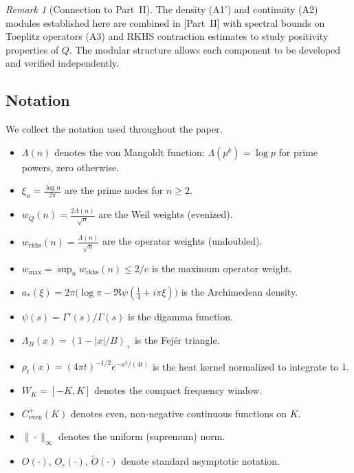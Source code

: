 \documentclass[11pt,a4paper]{article}
\theoremstyle{definition}
\theoremstyle{remark}
\newtheorem{remark}[theorem]{Remark}
\begin{document}
\begin{remark}[Connection to Part~II]\label{rem:part2}
The density (A1') and continuity (A2) modules established here are combined in [Part~II] with spectral bounds on Toeplitz operators (A3) and RKHS contraction estimates to study positivity properties of $Q$. The modular structure allows each component to be developed and verified independently.
\end{remark}

\subsection{Notation}\label{sec:notation}

We collect the notation used throughout the paper.

\begin{itemize}
\item $\Lambda(n)$ denotes the von Mangoldt function: $\Lambda(p^k) = \log p$ for prime powers, zero otherwise.

\item $\xi_n = \frac{\log n}{2\pi}$ are the prime nodes for $n \geq 2$.

\item $w_Q(n) = \frac{2\Lambda(n)}{\sqrt{n}}$ are the Weil weights (evenized).

\item $w_{\mathrm{rkhs}}(n) = \frac{\Lambda(n)}{\sqrt{n}}$ are the operator weights (undoubled).

\item $w_{\max} = \sup_n w_{\mathrm{rkhs}}(n) \leq 2/e$ is the maximum operator weight.

\item $a_*(\xi) = 2\pi\bigl(\log\pi - \Re\psi(\tfrac{1}{4} + i\pi\xi)\bigr)$ is the Archimedean density.

\item $\psi(s) = \Gamma'(s)/\Gamma(s)$ is the digamma function.

\item $\Lambda_B(x) = (1 - |x|/B)_+$ is the Fej\'er triangle.

\item $\rho_t(x) = (4\pi t)^{-1/2} e^{-x^2/(4t)}$ is the heat kernel normalized to integrate to $1$.

\item $W_K = [-K, K]$ denotes the compact frequency window.

\item $C^+_{\mathrm{even}}(K)$ denotes even, non-negative continuous functions on $K$.

\item $\|\cdot\|_\infty$ denotes the uniform (supremum) norm.

\item $O(\cdot)$, $O_\varepsilon(\cdot)$, $\tilde{O}(\cdot)$ denote standard asymptotic notation.
\end{itemize}
\end{document}
